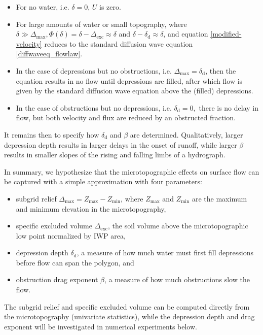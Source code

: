 %
\begin{itemize}
\item For no water, i.e. $\delta = 0$, $U$ is zero.
\item For large amounts of water or small topography, where $\delta \gg \Delta_\text{max}, \Phi(\delta) = \delta - \Delta_\text{exc} \approx \delta$ and $\delta - \delta_\text{d} \approx \delta$, and equation \ref{modified-velocity} reduces to the standard diffusion wave equation \ref{diffwaveeq_flowlaw}.
\item In the case of depressions but no obstructions, i.e. $\Delta_\text{max} = \delta_\text{d}$, then the equation results in no flow until depressions are filled, after which flow is given by the standard diffusion wave equation above the (filled) depressions.
\item In the case of obstructions but no depressions, i.e. $\delta_\text{d} = 0,$ there is no delay in flow, but both velocity and flux are reduced by an obstructed fraction.\end{itemize}
%
It remains then to specify how $\delta_\text{d}$ and $\beta$ are determined.
Qualitatively, larger depression depth results in larger delays in the onset of runoff, while larger $\beta$ results in smaller slopes of the rising and falling limbs of a hydrograph.


In summary, we hypothesize that the microtopographic effects on surface flow can be captured with a simple approximation with four parameters:
%
\begin{itemize}
\item subgrid relief $\Delta_\text{max} = Z_\text{max} -   Z_\text{min}$, where  $Z_\text{max}$ and  $Z_\text{min}$ are the maximum and minimum elevation in the microtopography,
\item specific excluded volume $\Delta_\text{exc}$, the soil volume above the microtopographic low point normalized by IWP area,
\item depression depth $\delta_\text{d}$, a measure of how much water must first fill depressions before flow can span the polygon, and
\item obstruction drag exponent $\beta$, a measure of how much obstructions slow the flow.
\end{itemize}
%
The subgrid relief and specific excluded volume can be computed directly from the microtopography (univariate statistics), while the depression depth and drag exponent will be investigated in numerical experiments below.

